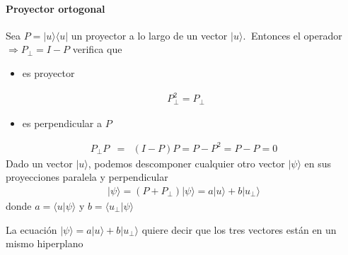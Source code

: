 \documentclass[letterpaper,10pt,english]{jupyterBook}
\let\sphinxpxdimen\pdfpxdimen\else\newdimen\sphinxpxdimen
\newcommand{\bra}[1]{\langle #1|}
\newcommand{\ket}[1]{|#1\rangle}
\newcommand{\braket}[2]{\langle #1|#2\rangle}
\begin{document}
\paragraph{Proyector ortogonal}
\label{\detokenize{docs/Part_01_Formalismo/Chapter_01_02_Formalismo_matem_xe1tico/01_03_Operadores_myst:proyector-ortogonal}}
\sphinxAtStartPar
Sea \(P = \ket{u}\bra{u}\) un proyector a lo largo de un vector \(\ket{u}.~\)
Entonces el operador \(\Rightarrow  P_\perp = I - P\) verifica que
\begin{itemize}
\item {} 
\sphinxAtStartPar
es proyector

\end{itemize}
\begin{equation*}
\begin{split}~~ P_\perp^2 = P_\perp \end{split}
\end{equation*}\begin{itemize}
\item {} 
\sphinxAtStartPar
es perpendicular a \(P\)

\end{itemize}
\label{equation:docs/Part_01_Formalismo/Chapter_01_02_Formalismo_matemático/01_03_Operadores_myst:568fc552-8978-42c6-8d70-e3f2cc9cd589}\begin{eqnarray}
P_\perp P &=& (I - P) P = P - P^2 = P - P =  0 
\end{eqnarray}
\sphinxAtStartPar
Dado un vector \(\ket{u}\), podemos descomponer cualquier  otro vector \(\ket{\psi}\) en sus proyecciones paralela y perpendicular
\begin{equation*}
\begin{split}
\ket{\psi} = ( P + P_\perp) \ket{\psi} = a \ket{u} + b \ket{u_\perp} 
\end{split}
\end{equation*}
\sphinxAtStartPar
donde \(a = \braket{u}{\psi}\) y  \(b = \braket{u_\perp}{\psi}\)

\sphinxAtStartPar
La ecuación \(\ket{\psi} = a \ket{u} + b\ket{u_\perp}\) quiere decir que los tres vectores están en un mismo hiperplano

\begin{figure}[htbp]
\centering

\noindent\sphinxincludegraphics[width=400\sphinxpxdimen]{{Projectors}.png}
\end{figure}
\end{document}
